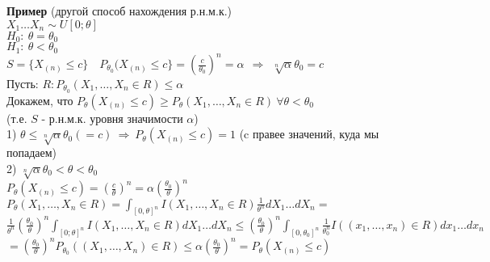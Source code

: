 \documentclass{article}
\begin{document}
\textbf{Пример} (другой способ нахождения р.н.м.к.)\\
$X_1\dots X_n\sim U[0;\theta]$\\
$H_0:\ \theta=\theta_0$\\
$H_1:\ \theta<\theta_0$\\

$S = \{X_{(n)} \leq c\}$ $\ \ \ P_{\theta_0}(X_{(n)}\leq c\} = \left(\frac{c}{\theta_0}\right)^{n} = \alpha\ \ \Rightarrow \ \ \sqrt[n]{\alpha}\theta_0 = c$\\
Пусть:
$R: P_{\theta_0}(X_1,\dots,X_n\in R)\leq \alpha$\\

Докажем, что $P_\theta(X_{(n)}\leq c)\geq P_\theta(X_1,\dots,X_n\in R)\ \forall\theta<\theta_0$\\
(т.е. $S$ - р.н.м.к. уровня значимости $\alpha$)\\
1) $\theta\leq \sqrt[n]{\alpha}\theta_0 (= c)\ \Rightarrow\ P_\theta(X_{(n)}\leq c) = 1$ (c правее значений, куда мы попадаем)\\
2) $\sqrt[n]{\alpha}\theta_0<\theta<\theta_0$\\
$P_\theta(X_{(n)}\leq c) = \left(\frac{c}{\theta}\right)^n = \alpha\left(\frac{\theta_0}{\theta}\right)^n$\\
$P_\theta(X_1,\dots,X_n\in R) = \int_{[0,\theta]^n}{I(X_1,\dots,X_n\in R)\frac{1}{\theta^n}dX_1\dots dX_n} =$ \\$  \frac{1}{\theta^n}\left(\frac{\theta_0}{\theta}\right)^n\int_{[0;\theta]^n}{I(X_1,\dots,X_n\in R)dX_1\dots dX_n} \leq \left(\frac{\theta_0}{\theta}\right)^n\int_{[0,\theta_0]^n}{\frac{1}{\theta_0^n}I((x_1,\dots,x_n)\in R)dx_1\dots dx_n}$\\
$= \left(\frac{\theta_0}{\theta}\right)^nP_{\theta_0}((X_1,\dots,X_n)\in R) 
\leq \alpha\left(\frac{\theta_0}{\theta}\right)^n = P_\theta(X_{(n)}\leq c)$\\

 
\end{document}
